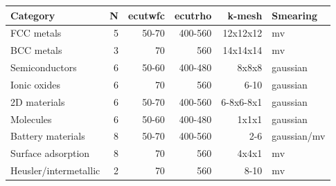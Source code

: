\begin{tabular}{lrrrrl}
\toprule
Category & N & ecutwfc & ecutrho & k-mesh & Smearing \\
\midrule
FCC metals & 5 & 50-70 & 400-560 & 12x12x12 & mv \\
BCC metals & 3 & 70 & 560 & 14x14x14 & mv \\
Semiconductors & 6 & 50-60 & 400-480 & 8x8x8 & gaussian \\
Ionic oxides & 6 & 70 & 560 & 6-10 & gaussian \\
2D materials & 6 & 50-70 & 400-560 & 6-8x6-8x1 & gaussian \\
Molecules & 6 & 50-60 & 400-480 & 1x1x1 & gaussian \\
Battery materials & 8 & 50-70 & 400-560 & 2-6 & gaussian/mv \\
Surface adsorption & 8 & 70 & 560 & 4x4x1 & mv \\
Heusler/intermetallic & 2 & 70 & 560 & 8-10 & mv \\
\bottomrule
\end{tabular}